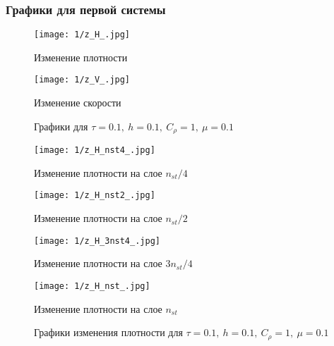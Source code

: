 \subsubsection{Графики для первой системы}

\begin{figure}[h]
	\centering
	\begin{minipage}[b]{0.49\linewidth}
		\centering
		\texttt{[image: 1/z\_H\_.jpg]}  %
		\caption{Изменение плотности}
	\end{minipage}%
	\hfill
	\begin{minipage}[b]{0.49\linewidth}
		\centering
		\texttt{[image: 1/z\_V\_.jpg]}  %
		\caption{Изменение скорости}
	\end{minipage}
	\caption{Графики для $\tau = 0.1, \ h = 0.1, \ C_{\rho} = 1, \ \mu = 0.1$}
	\label{ris:images}
\end{figure}

\begin{figure}[h]
	\begin{minipage}[h]{0.47\linewidth}
		\centering
		\texttt{[image: 1/z\_H\_nst4\_.jpg]} 
		\caption{Изменение плотности на слое $n_{st} / 4$}
	\end{minipage}
	\hfill
	\begin{minipage}[h]{0.47\linewidth}
		\centering
		\texttt{[image: 1/z\_H\_nst2\_.jpg]} 
		\caption{Изменение плотности на слое $n_{st} / 2$}
	\end{minipage}
	\vfill
	\begin{minipage}[h]{0.47\linewidth}
		\centering
		\texttt{[image: 1/z\_H\_3nst4\_.jpg]} 
		\caption{Изменение плотности на слое $3n_{st} / 4$}
	\end{minipage}
	\hfill
	\begin{minipage}[h]{0.47\linewidth}
		\centering
		\texttt{[image: 1/z\_H\_nst\_.jpg]} 
		\caption{Изменение плотности на слое $n_{st}$}
	\end{minipage}
	\caption{Графики изменения плотности для $\tau = 0.1, \ h = 0.1, \ C_{\rho} = 1, \ \mu = 0.1$}
	\label{ris:experimentalcorrelationsignals}
\end{figure}

